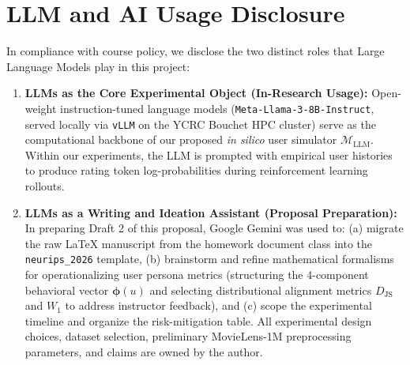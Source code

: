\documentclass{article}
\begin{document}
\section{LLM and AI Usage Disclosure}
In compliance with course policy, we disclose the two distinct roles that Large Language Models play in this project:
\begin{enumerate}
    \item \textbf{LLMs as the Core Experimental Object (In-Research Usage):} Open-weight instruction-tuned language models (\texttt{Meta-Llama-3-8B-Instruct}, served locally via \texttt{vLLM} on the YCRC Bouchet HPC cluster) serve as the computational backbone of our proposed \textit{in silico} user simulator $\mathcal{M}_{\text{LLM}}$. Within our experiments, the LLM is prompted with empirical user histories to produce rating token log-probabilities during reinforcement learning rollouts.
    \item \textbf{LLMs as a Writing and Ideation Assistant (Proposal Preparation):} In preparing Draft 2 of this proposal, Google Gemini was used to: (a) migrate the raw LaTeX manuscript from the homework document class into the \texttt{neurips\_2026} template, (b) brainstorm and refine mathematical formalisms for operationalizing user persona metrics (structuring the 4-component behavioral vector $\bm{\phi}(u)$ and selecting distributional alignment metrics $D_{\text{JS}}$ and $W_1$ to address instructor feedback), and (c) scope the experimental timeline and organize the risk-mitigation table. All experimental design choices, dataset selection, preliminary MovieLens-1M preprocessing parameters, and claims are owned by the author.
\end{enumerate}
\end{document}
